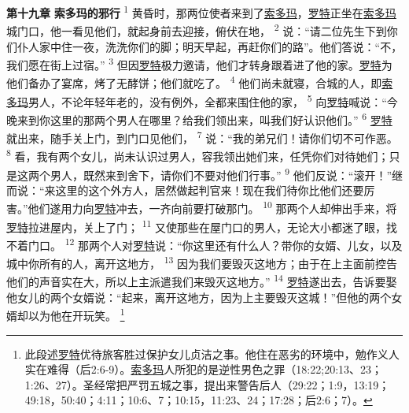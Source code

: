 \textbf{第十九章 }
\textbf{索多玛的邪行 }
\textsuperscript{1}
黄昏时，那两位使者来到了\uline{索多玛}，\uline{罗特}正坐在\uline{索多玛}城门口，他一看见他们，就起身前去迎接，俯伏在地，
\textsuperscript{2}
说：“请二位先生下到你们仆人家中住一夜，洗洗你们的脚；明天早起，再赶你们的路”。他们答说：“不，我们愿在街上过宿。”
\textsuperscript{3}
但因\uline{罗特}极力邀请，他们才转身跟着进了他的家。\uline{罗特}为他们备办了宴席，烤了无酵饼；他们就吃了。
\textsuperscript{4}
他们尚未就寝，合城的人，即\uline{索多玛}男人，不论年轻年老的，没有例外，全都来围住他的家，
\textsuperscript{5}
向\uline{罗特}喊说：“今晚来到你这里的那两个男人在哪里？给我们领出来，叫我们好认识他们。”
\textsuperscript{6}
\uline{罗特}就出来，随手关上门，到门口见他们，
\textsuperscript{7}
说：“我的弟兄们！请你们切不可作恶。
\textsuperscript{8}
看，我有两个女儿，尚未认识过男人，容我领出她们来，任凭你们对待她们；只是这两个男人，既然来到舍下，请你们不要对他们行事。”
\textsuperscript{9}
他们反说：“滚开！”继而说：“来这里的这个外方人，居然做起判官来！现在我们待你比他们还要厉害。”他们遂用力向\uline{罗特}冲去，一齐向前要打破那门。
\textsuperscript{10}
那两个人却伸出手来，将\uline{罗特}拉进屋内，关上了门；
\textsuperscript{11}
又使那些在屋门口的男人，无论大小都迷了眼，找不着门口。
\textsuperscript{12}
那两个人对\uline{罗特}说：“你这里还有什么人？带你的女婿、儿女，以及城中你所有的人，离开这地方，
\textsuperscript{13}
因为我们要毁灭这地方；由于在上主面前控告他们的声音实在大，所以上主派遣我们来毁灭这地方。”
\textsuperscript{14}
\uline{罗特}遂出去，告诉要娶他女儿的两个女婿说：“起来，离开这地方，因为上主要毁灭这城！”但他的两个女婿却以为他在开玩笑。
\footnote{此段述\uline{罗特}优待旅客胜过保护女儿贞洁之事。他住在恶劣的环境中，勉作义人实在难得（后2:6-9）。\uline{索多玛}人所犯的是逆性男色之罪（18:22;20:13、23；1:26、27）。圣经常把严罚五城之事，提出来警告后人（29:22；1:9，13:19；49:18，50:40；4:11；10:6、7；10:15，11:23、24；17:28；后2:6；7）。}

